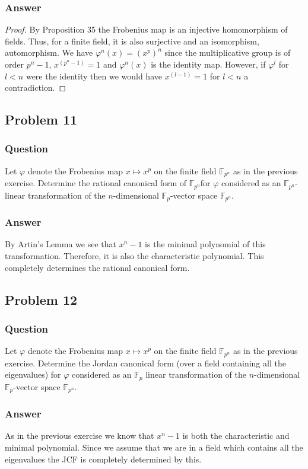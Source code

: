 \documentclass[10pt]{article}
\begin{document}
\subsubsection{Answer}
\begin{proof}
By Proposition 35 the Frobenius map is an injective homomorphism of fields. Thus, for a finite field, it is also surjective and an isomorphism, automorphism. We have $\varphi^n(x)= (x^p)^n$ since the multiplicative group is of order $p^n-1$, $x^{(p^n-1)}=1$ and $\varphi^n(x)$ is the identity map. However, if $\varphi^l$ for $l<n$ were the identity then we would have $x^{(l-1)}=1$ for $l<n$ a contradiction.
\end{proof}


\subsection{Problem 11}
\subsubsection{Question}
Let $\varphi$ denote the Frobenius map $x \mapsto x^p$ on the finite field $\mathbb{F}_{p^n}$ as in the previous exercise. Determine the rational canonical form of $\mathbb{F}_{p^n}$for $\varphi$ considered as an $\mathbb{F}_{p^n}$-linear transformation of the $n$-dimensional $\mathbb{F}_p$-vector space $\mathbb{F}_{p^n}$.
\subsubsection{Answer}
By Artin's Lemma we see that $x^n-1$ is the minimal polynomial of this transformation. Therefore, it is also the characteristic polynomial. This completely determines the rational canonical form.

\subsection{Problem 12}
\subsubsection{Question}
Let $\varphi$ denote the Frobenius map $x \mapsto x^p$ on the finite field $\mathbb{F}_{p^n}$ as in the previous exercise. Determine the Jordan canonical form (over a field containing all the eigenvalues) for $\varphi$ considered as an $\mathbb{F}_p$ linear transformation of the $n$-dimensional $\mathbb{F}_p$-vector space $\mathbb{F}_{p^n}$.
\subsubsection{Answer}
As in the previous exercise we know that $x^n-1$ is both the characteristic and minimal polynomial. Since we assume that we are in a field which contains all the eigenvalues the JCF is completely determined by this.
\end{document}
